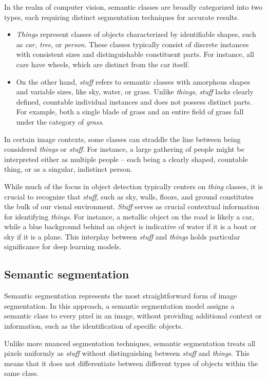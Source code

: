 In the realm of computer vision, semantic classes are broadly categorized into two types, each requiring distinct segmentation techniques for accurate results.
\begin{itemize}
  \item \textit{Things} represent classes of objects characterized by identifiable shapes, such as \textit{car, tree,} or \textit{person}. These classes typically consist of discrete instances with consistent sizes and distinguishable constituent parts. For instance, all cars have wheels, which are distinct from the car itself.
  \item On the other hand, \textit{stuff} refers to semantic classes with amorphous shapes and variable sizes, like sky, water, or grass. Unlike \textit{things}, \textit{stuff} lacks clearly defined, countable individual instances and does not possess distinct parts. For example, both a single blade of grass and an entire field of grass fall under the category of \textit{grass}.
\end{itemize}
In certain image contexts, some classes can straddle the line between being considered \textit{things} or \textit{stuff}. For instance, a large gathering of people might be interpreted either as multiple people -- each being a clearly shaped, countable thing, or as a singular, indistinct person.

While much of the focus in object detection typically centers on \textit{thing} classes, it is crucial to recognize that \textit{stuff}, such as sky, walls, floors, and ground constitutes the bulk of our visual environment. \textit{Stuff} serves as crucial contextual information for identifying \textit{things}. For instance, a metallic object on the road is likely a car, while a blue background behind an object is indicative of water if it is a boat or sky if it is a plane. This interplay between \textit{stuff} and \textit{things} holds particular significance for deep learning models.

  \subsection{Semantic segmentation}
Semantic segmentation represents the most straightforward form of image segmentation. In this approach, a semantic segmentation model assigns a semantic class to every pixel in an image, without providing additional context or information, such as the identification of specific objects.

Unlike more nuanced segmentation techniques, semantic segmentation treats all pixels uniformly as \textit{stuff} without distinguishing between \textit{stuff} and \textit{things}. This means that it does not differentiate between different types of objects within the same class.

